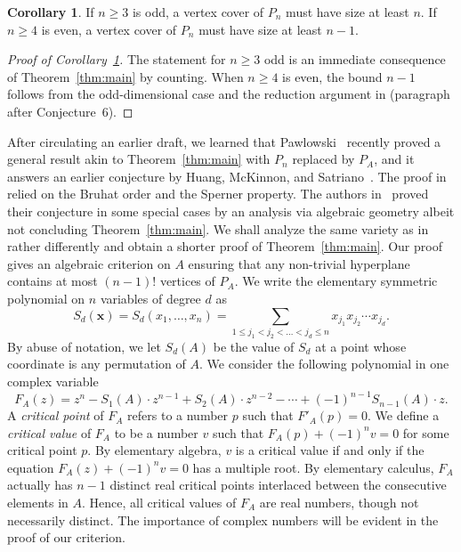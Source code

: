 \documentclass[11pt]{article}
\theoremstyle{definition}
\newtheorem{corollary}[theorem]{Corollary}
\begin{document}
\begin{corollary}\label{main}
  If $n \geq 3$ is odd, a vertex cover of $P_n$ must have size at least $n$. If $n \geq 4$ is even, a vertex cover of $P_n$ must have size at least $n-1$.
\end{corollary}

\begin{proof}[Proof of Corollary~\ref{main}]
  The statement for $n\ge 3$ odd is an immediate consequence of Theorem~\ref{thm:main} by counting. When $n\ge 4$ is even, the bound $n-1$ follows from the odd-dimensional case and the reduction argument in \cite{hegedus2024covering} (paragraph after Conjecture~6).
\end{proof}

After circulating an earlier draft, we learned that Pawlowski~\cite{pawlowski2024} recently proved a general result akin to Theorem~\ref{thm:main} with $P_n$ replaced by $P_A$, and it answers an earlier conjecture by Huang, McKinnon, and Satriano~\cite{huang2021fraction}. The proof in \cite{pawlowski2024} relied on the Bruhat order and the Sperner property. The authors in~\cite{huang2021fraction} proved their conjecture in some special cases by an analysis via algebraic geometry albeit not concluding Theorem~\ref{thm:main}. We shall analyze the same variety as in \cite{huang2021fraction} rather differently and obtain a shorter proof of Theorem~\ref{thm:main}. Our proof gives an algebraic criterion on $A$ ensuring that any non-trivial hyperplane contains at most $(n-1)!$ vertices of $P_A$. We write the elementary symmetric polynomial on $n$ variables of degree $d$ as
\begin{equation*}
  S_d(\textbf{x}) = S_d(x_1,\dots,x_n) = \sum_{1\leq j_1<j_2<\dots<j_d \leq n} x_{j_1} x_{j_2}\cdots x_{j_d}.
\end{equation*} By abuse of notation, we let $S_d(A)$ be the value of $S_d$ at a point whose coordinate is any permutation of $A$. We consider the following polynomial in one complex variable
\begin{equation*}
  F_A(z) = z^n - S_1(A) \cdot z^{n-1} + S_2(A) \cdot z^{n-2} - \cdots + (-1)^{n-1} S_{n-1}(A) \cdot z.
\end{equation*} A \textit{critical point} of $F_A$ refers to a number $p$ such that $F'_A(p) = 0$. We define a \textit{critical value} of $F_A$ to be a number $v$ such that $F_A(p) + (-1)^n v = 0$ for some critical point $p$. By elementary algebra, $v$ is a critical value if and only if the equation $F_A(z) + (-1)^n v = 0$ has a multiple root. By elementary calculus, $F_A$ actually has $n-1$ distinct real critical points interlaced between the consecutive elements in $A$. Hence, all critical values of $F_A$ are real numbers, though not necessarily distinct. The importance of complex numbers will be evident in the proof of our criterion.
\end{document}
